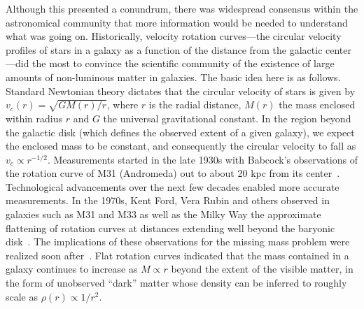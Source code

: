 Although this presented a conundrum, there was widespread consensus within the astronomical community that more information would be needed to understand what was going on. Historically, velocity rotation curves---the circular velocity profiles of stars in a galaxy as a function of the distance from the galactic center---did the most to convince the scientific community of the existence of large amounts of non-luminous matter in galaxies. The basic idea here is as follows. Standard Newtonian theory dictates that the circular velocity of stars is given by $v_c(r) = \sqrt{GM(r)/r}$, where $r$ is the radial distance, $M(r)$ the mass enclosed within radius $r$ and $G$ the universal gravitational constant. In the region beyond the galactic disk (which defines the observed extent of a given galaxy), we expect the enclosed mass to be constant, and consequently the circular velocity to fall as $v_c \propto r^{-1/2}$. Measurements started in the late 1930s with Babcock's observations of the rotation curve of M31 (Andromeda) out to about 20 kpc from its center~\cite{1939LicOB..19...41B}. Technological advancements over the next few decades enabled more accurate measurements. 
In the 1970s, Kent Ford, Vera Rubin and others observed in galaxies such as M31 and M33 as well as the Milky Way the approximate flattening of rotation curves at distances extending well beyond the baryonic disk~\cite{1970ApJ...159..379R,1973A&A....26..483R}. The implications of these observations for the missing mass problem were realized soon after~\cite{1974Natur.250..309E,1974ApJ...193L...1O}. Flat rotation curves indicated that the mass contained in a galaxy continues to increase as $M \propto r$ beyond the extent of the visible matter, in the form of unobserved ``dark'' matter whose density can be inferred to roughly scale as $\rho(r) \propto 1/r^2$.
